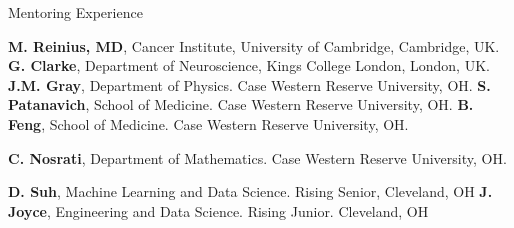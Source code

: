 \begin{rubric}{Mentoring Experience}

\entry*[2021-current] \textbf{M. Reinius, MD}, Cancer Institute, University of Cambridge, Cambridge, UK.
\entry*[2022-2023] \textbf{G. Clarke}, Department of Neuroscience, Kings College London, London, UK. 
\entry*[2022-current] \textbf{J.M. Gray}, Department of Physics. Case Western Reserve University, OH.
\entry*[2022-current] \textbf{S. Patanavich}, School of Medicine. Case Western Reserve University,  OH.
\entry*[2022-current] \textbf{B. Feng}, School of Medicine. Case Western Reserve University,  OH.

\entry*[2022-2023] \textbf{C. Nosrati}, Department of Mathematics. Case Western Reserve University,  OH.

\entry*[2022] \textbf{D. Suh}, Machine Learning and Data Science. Rising Senior, Cleveland, OH
\entry*[2023-current] \textbf{J. Joyce}, Engineering and Data Science. Rising Junior. Cleveland, OH
\end{rubric}